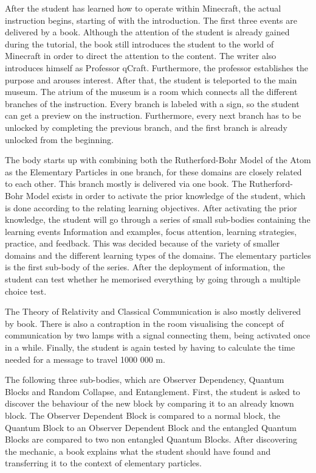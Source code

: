 \documentclass[11pt,twoside]{report} %
\begin{document}
After the student has learned how to operate within Minecraft, the actual instruction begins, starting of with the introduction. The first three events are delivered by a book. Although the attention of the student is already gained during the tutorial, the book still introduces the student to the world of Minecraft in order to direct the attention to the content. The writer also introduces himself as Professor qCraft. Furthermore, the professor establishes the purpose and arouses interest. After that, the student is teleported to the main museum. The atrium of the museum is a room which connects all the different branches of the instruction. Every branch is labeled with a sign, so the student can get a preview on the instruction. Furthermore, every next branch has to be unlocked by completing the previous branch, and the first branch is already unlocked from the beginning.

The body starts up with combining both the Rutherford-Bohr Model of the Atom as the Elementary Particles in one branch, for these domains are closely related to each other. This branch mostly is delivered via one book. The Rutherford-Bohr Model exists in order to activate the prior knowledge of the student, which is done according to the relating learning objectives. After activating the prior knowledge, the student will go through a series of small sub-bodies containing the learning events Information and examples, focus attention, learning strategies, practice, and feedback. This was decided because of the variety of smaller domains and the different learning types of the domains. The elementary particles is the first sub-body of the series. After the deployment of information, the student can test whether he memorised everything by going through a multiple choice test.

The Theory of Relativity and Classical Communication is also mostly delivered by book. There is also a contraption in the room visualising the concept of communication by two lamps with a signal connecting them, being activated once in a while. Finally, the student is again tested by having to calculate the time needed for a message to travel 1000 000 m.

The following three sub-bodies, which are Observer Dependency, Quantum Blocks and Random Collapse, and Entanglement. First, the student is asked to discover the behaviour of the new block by comparing it to an already known block. The Observer Dependent Block is compared to a normal block, the Quantum Block to an Observer Dependent Block and the entangled Quantum Blocks are compared to two non entangled Quantum Blocks. After discovering the mechanic, a book explains what the student should have found and transferring it to the context of elementary particles.
\end{document}
